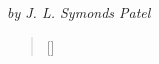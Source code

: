 \documentclass[a4paper,12pt,oneside]{memoir}
\begin{document}
\PlainPoemTitle
\PoemTitle{{\Huge}}
\begin{center}
  \emph{by J. L. Symonds Patel}
\end{center}
\vspace{1em}

\settowidth{\versewidth}{}
\begin{verse}[\versewidth]
  
\end{verse}
\end{document}
